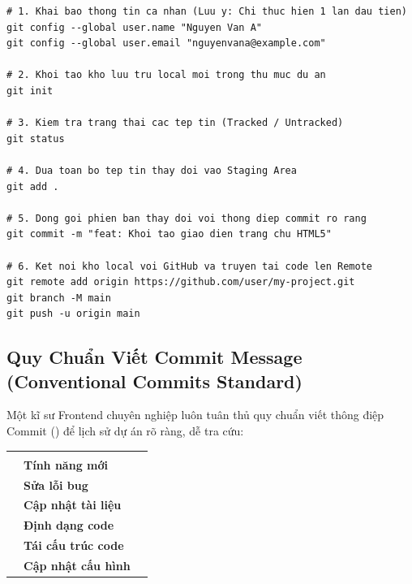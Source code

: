 \begin{codeWindow}
\begin{lstlisting}[language=HTTP]
# 1. Khai bao thong tin ca nhan (Luu y: Chi thuc hien 1 lan dau tien)
git config --global user.name "Nguyen Van A"
git config --global user.email "nguyenvana@example.com"

# 2. Khoi tao kho luu tru local moi trong thu muc du an
git init

# 3. Kiem tra trang thai cac tep tin (Tracked / Untracked)
git status

# 4. Dua toan bo tep tin thay doi vao Staging Area
git add .

# 5. Dong goi phien ban thay doi voi thong diep commit ro rang
git commit -m "feat: Khoi tao giao dien trang chu HTML5"

# 6. Ket noi kho local voi GitHub va truyen tai code len Remote
git remote add origin https://github.com/user/my-project.git
git branch -M main
git push -u origin main
\end{lstlisting}
\end{codeWindow}

\subsection{Quy Chuẩn Viết Commit Message (Conventional Commits Standard)}

Một kĩ sư Frontend chuyên nghiệp luôn tuân thủ quy chuẩn viết thông điệp Commit () để lịch sử dự án rõ ràng, dễ tra cứu:

\begin{prettyTableBox}
\begin{tabularx}{\linewidth}{K{2.5cm} >{\bfseries\color{primaryBlue}}C{3.0cm} Z}
 &  &  \\
 & Tính năng mới &  \\
 & Sửa lỗi bug &  \\
 & Cập nhật tài liệu &  \\
 & Định dạng code &  \\
 & Tái cấu trúc code &  \\
 & Cập nhật cấu hình &  \\
\end{tabularx}
\end{prettyTableBox}

